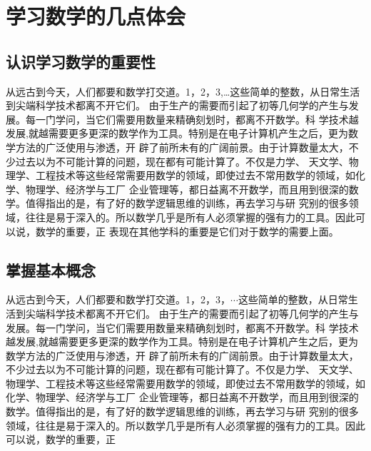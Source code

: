 \documentclass[twoside,openright,headings=optiontohead]{ctexbook} %
\begin{document}
{\hypertarget{ux5b66ux4e60ux6570ux5b66ux7684ux51e0ux70b9ux4f53ux4f1a}{%
\chapter*{学习数学的几点体会}\label{ux5b66ux4e60ux6570ux5b66ux7684ux51e0ux70b9ux4f53ux4f1a}}

\hypertarget{ux8ba4ux8bc6ux5b66ux4e60ux6570ux5b66ux7684ux91cdux8981ux6027}{%
\section*{认识学习数学的重要性}\label{ux8ba4ux8bc6ux5b66ux4e60ux6570ux5b66ux7684ux91cdux8981ux6027}}

从远古到今天，人们都要和数学打交道。1，2，3,\ldots{}这些简单的整数，从日常生活到尖端科学技术都离不开它们。
由于生产的需要而引起了初等几何学的产生与发展。每一门学问，当它们需要用数量来精确刻划时，都离不开数学。科
学技术越发展,就越需要更多更深的数学作为工具。特别是在电子计算机产生之后，更为数学方法的广泛使用与渗透，开
辟了前所未有的广阔前景。由于计算数量太大，不少过去以为不可能计算的问题，现在都有可能计算了。不仅是力学、
天文学、物理学、工程技术等这些经常需要用数学的领域，即使过去不常用数学的领域，如化学、物理学、经济学与工厂
企业管理等，都日益离不开数学，而且用到很深的数学。值得指出的是，有了好的数学逻辑思维的训练，再去学习与研
究别的很多领域，往往是易于深入的。所以数学几乎是所有人必须掌握的强有力的工具。因此可以说，数学的重要，正
表现在其他学科的重要是它们对于数学的需要上面。

\hypertarget{ux638cux63e1ux57faux672cux6982ux5ff5}{%
\section*{掌握基本概念}\label{ux638cux63e1ux57faux672cux6982ux5ff5}}

从远古到今天，人们都要和数学打交道。1，2，3，\(\cdots\)这些简单的整数，从日常生活到尖端科学技术都离不开它们。
由于生产的需要而引起了初等几何学的产生与发展。每一门学问，当它们需要用数量来精确刻划时，都离不开数学。科
学技术越发展,就越需要更多更深的数学作为工具。特别是在电子计算机产生之后，更为数学方法的广泛使用与渗透，开
辟了前所未有的广阔前景。由于计算数量太大，不少过去以为不可能计算的问题，现在都有可能计算了。不仅是力学、
天文学、物理学、工程技术等这些经常需要用数学的领域，即使过去不常用数学的领域，如化学、物理学、经济学与工厂
企业管理等，都日益离不开数学，而且用到很深的数学。值得指出的是，有了好的数学逻辑思维的训练，再去学习与研
究别的很多领域，往往是易于深入的。所以数学几乎是所有人必须掌握的强有力的工具。因此可以说，数学的重要，正

}
\end{document}
